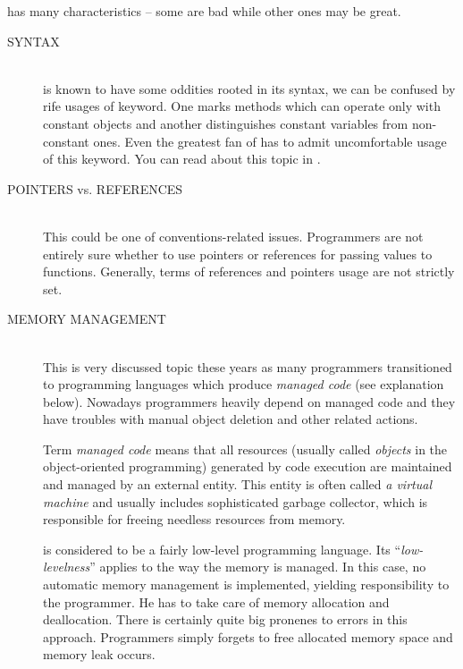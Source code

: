 \cpp{} has many characteristics -- some are bad while other ones may be great.
\begin{description}
\item[SYNTAX\ts{\textcolor{red}{bad}}]\hfill \\
\cpp{} is known to have some oddities rooted in its syntax, \eg we can be confused by rife usages of keyword. One marks methods which can operate only with constant objects and another distinguishes constant variables from non-constant ones. Even the greatest fan of \cpp{} has to admit uncomfortable usage of this keyword. You can read about this topic in \citep[p.~90--92, p.~537]{prata:cprimer}.

\item[POINTERS vs. REFERENCES\ts{\textcolor{red}{bad}}]\hfill \\
This could be one of conventions-related issues. Programmers are not entirely sure whether to use pointers or references for passing values to functions. Generally, terms of references and pointers usage are not strictly set.

\item[MEMORY MANAGEMENT\ts{\textcolor{red}{bad}, \textcolor{ultragreen}{good}}]\hfill \\
This is very discussed topic these years as many programmers transitioned to programming languages which produce
\emph{managed code} (see explanation below). Nowadays programmers heavily depend on managed code and they have troubles with manual
object deletion and other related actions.

\begin{fdocextra}
Term \textit{managed code} means that all resources (usually called \emph{objects} in the object-oriented programming) generated by code execution are maintained and managed by an external entity. This entity is often called \emph{a virtual machine} and usually includes sophisticated garbage collector, which is responsible for freeing needless resources from memory.
\end{fdocextra}

\cpp{} is considered to be a fairly low-level programming language. Its \enquote{\textit{low-levelness}} applies to the way the memory is managed. In this case, no automatic memory management is implemented, yielding responsibility to the programmer. He has to take care of memory allocation and deallocation. There is certainly quite big pronenes to errors in this approach. Programmers simply forgets to free allocated memory space and memory leak occurs.


\end{description}
